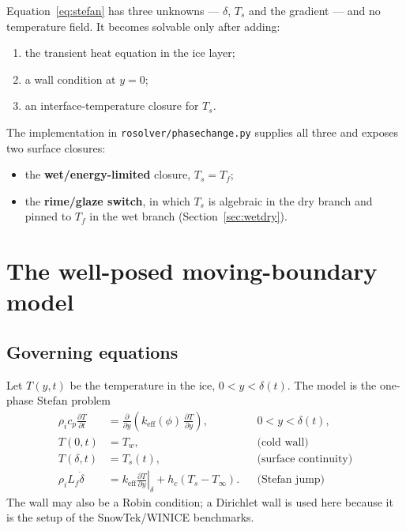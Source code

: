 \documentclass[11pt,a4paper]{article}
\newcommand{\pd}[2]{\frac{\partial #1}{\partial #2}}
\newcommand{\Ts}{T_s}
\newcommand{\Tw}{T_w}
\newcommand{\Tinf}{T_\infty}
\newcommand{\Tf}{T_f}
\newcommand{\Lf}{L_f}
\newcommand{\keff}{k_{\mathrm{eff}}}
\begin{document}
Equation~\eqref{eq:stefan} has three unknowns --- $\delta$, $\Ts$ and the gradient ---
and no temperature field. It becomes solvable only after adding:
\begin{enumerate}[leftmargin=1.4em,itemsep=2pt]
  \item the transient heat equation in the ice layer;
  \item a wall condition at $y=0$;
  \item an interface-temperature closure for $\Ts$.
\end{enumerate}

The implementation in \texttt{rosolver/phasechange.py} supplies all three and exposes two
surface closures:
\begin{itemize}[leftmargin=1.4em,itemsep=2pt]
  \item the \textbf{wet/energy-limited} closure, $\Ts=\Tf$;
  \item the \textbf{rime/glaze switch}, in which $\Ts$ is algebraic in the dry branch and
        pinned to $\Tf$ in the wet branch (Section~\ref{sec:wetdry}).
\end{itemize}

\section{The well-posed moving-boundary model}\label{sec:model}

\subsection{Governing equations}

Let $T(y,t)$ be the temperature in the ice, $0<y<\delta(t)$. The model is the one-phase
Stefan problem
\begin{align}
  \rho_i c_p \pd{T}{t} &= \pd{}{y}\!\left(\keff(\phi)\,\pd{T}{y}\right),
     && 0<y<\delta(t), \label{eq:heat}\\
  T(0,t) &= \Tw, && \text{(cold wall)} \label{eq:wall}\\
  T(\delta,t) &= \Ts(t), && \text{(surface continuity)} \label{eq:surfT}\\
  \rho_i \Lf \dot\delta
     &= \keff\left.\pd{T}{y}\right|_{\delta}
        + h_c\left(\Ts-\Tinf\right). && \text{(Stefan jump)} \label{eq:stefanjump}
\end{align}
The wall may also be a Robin condition; a Dirichlet wall is used here because it is the
setup of the SnowTek/WINICE benchmarks.
\end{document}
